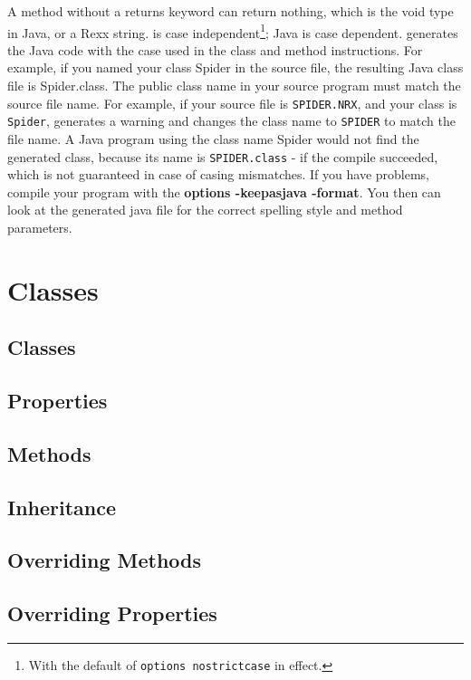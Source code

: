 {A \nr{} method without a returns keyword can return nothing, which is the void type in Java, or a Rexx string. 
\nr{}is case independent\footnote{With the default of \texttt{options
  nostrictcase} in effect.}; Java is case dependent. \nr{} generates
the Java code with the case used in the class and method
instructions. For example, if you named your class Spider in the \nr{}
source file, the resulting Java class file is Spider.class.
The public class name in your source program must match the \nr{}
source file name. For example, if your source file is \texttt{SPIDER.NRX}, and
your class is \texttt{Spider}, \nr{} generates a warning and changes the
class name to \texttt{SPIDER} to match the file name. A Java program using the
class name Spider would not find the generated class, because its name
is \texttt{SPIDER.class} - if the compile succeeded, which is not guaranteed in
case of casing mismatches.
If you have problems, compile your \nr{} program with the \textbf{options
-keepasjava -format}. You then can look at the generated java file for the correct spelling style and method parameters.

\chapter{Classes}\label{classes}
\section{Classes}
\section{Properties}
\section{Methods}
\section{Inheritance}
\section{Overriding Methods}
\section{Overriding Properties}
}
